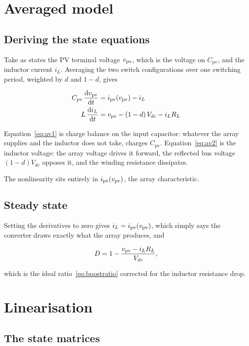 \section{Averaged model}

\subsection{Deriving the state equations}

Take as states the PV terminal voltage $v_{\mathrm{pv}}$, which is the voltage on
$C_{\mathrm{pv}}$, and the inductor current $i_L$. Averaging the two switch
configurations over one switching period, weighted by $d$ and $1-d$, gives

\begin{align}
C_{\mathrm{pv}}\,\frac{\mathrm{d}v_{\mathrm{pv}}}{\mathrm{d}t} &= i_{\mathrm{pv}}(v_{\mathrm{pv}}) - i_L \label{eq:av1}\\
L\,\frac{\mathrm{d}i_L}{\mathrm{d}t} &= v_{\mathrm{pv}} - (1-d)\,V_{dc} - i_L R_L \label{eq:av2}
\end{align}

Equation~\eqref{eq:av1} is charge balance on the input capacitor: whatever the
array supplies and the inductor does not take, charges $C_{\mathrm{pv}}$.
Equation~\eqref{eq:av2} is the inductor voltage: the array voltage drives it
forward, the reflected bus voltage $(1-d)V_{dc}$ opposes it, and the winding
resistance dissipates.

The nonlinearity sits entirely in $i_{\mathrm{pv}}(v_{\mathrm{pv}})$, the array characteristic.

\subsection{Steady state}

Setting the derivatives to zero gives $i_L = i_{\mathrm{pv}}(v_{\mathrm{pv}})$, which simply says the
converter draws exactly what the array produces, and

\begin{equation}
D = 1 - \frac{v_{\mathrm{pv}} - i_L R_L}{V_{dc}},
\label{eq:dutyexact}
\end{equation}

which is the ideal ratio~\eqref{eq:boostratio} corrected for the inductor
resistance drop.

\section{Linearisation}

\subsection{The state matrices}

